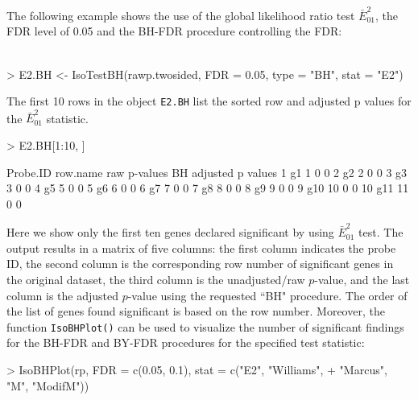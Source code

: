\documentclass[10pt]{article}
\begin{document}
The following example shows the use of the global likelihood ratio
test $\bar{E}^{2}_{01}$, the FDR level of 0.05 and the BH-FDR
procedure controlling the FDR: \\ \\

\begin{Schunk}
\begin{Sinput}
> E2.BH <- IsoTestBH(rawp.twosided, FDR = 0.05, type = "BH", stat = "E2")
\end{Sinput}
\end{Schunk}

The first 10 rows in the object \texttt{E2.BH} list the sorted row and adjusted p values for the $\bar{E}^{2}_{01}$ statistic.

\begin{Schunk}
\begin{Sinput}
> E2.BH[1:10, ]
\end{Sinput}
\begin{Soutput}
   Probe.ID row.name raw p-values BH adjusted p values
1        g1        1            0                    0
2        g2        2            0                    0
3        g3        3            0                    0
4        g5        5            0                    0
5        g6        6            0                    0
6        g7        7            0                    0
7        g8        8            0                    0
8        g9        9            0                    0
9       g10       10            0                    0
10      g11       11            0                    0
\end{Soutput}
\end{Schunk}

Here we show only the first ten genes declared significant by using
$\bar{E}^{2}_{01}$ test. The output results in a matrix of five
columns: the first column indicates the probe ID, the second column
is the corresponding row number of significant genes in the original
dataset, the third column is the unadjusted/raw $p$-value, and the
last column is the adjusted $p$-value using the requested ``BH"
procedure. The order of the list of genes found significant is based
on the row number. Moreover, the function \texttt{IsoBHPlot()} can
be used to visualize the number of significant findings for the
BH-FDR and BY-FDR procedures for the specified test statistic:

\begin{Schunk}
\begin{Sinput}
> IsoBHPlot(rp, FDR = c(0.05, 0.1), stat = c("E2", "Williams", 
+     "Marcus", "M", "ModifM"))
\end{Sinput}
\end{Schunk}
\end{document}
